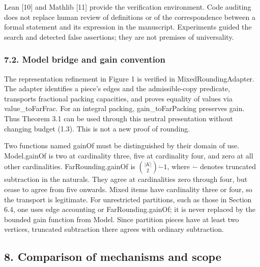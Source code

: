 \documentclass[english,11pt,a4paper]{article}
\begin{document}
Lean {[}10{]} and Mathlib {[}11{]} provide the verification environment. Code auditing does not replace human review of definitions or of the correspondence between a formal statement and its expression in the manuscript. Experiments guided the search and detected false assertions; they are not premises of universality.

\subsubsection{7.2. Model bridge and gain convention}\label{model-bridge-and-gain-convention}

The representation refinement in Figure 1 is verified in {\ttfamily\small MixedRoundin\discretionary{\hbox{\ensuremath{\hookrightarrow}}}{}{}gAdapter}. The adapter identifies a piece's edges and the admissible-copy predicate, transports fractional packing capacities, and proves equality of values via {\ttfamily\small value\_\discretionary{\hbox{\ensuremath{\hookrightarrow}}}{}{}toFarFrac}. For an integral packing, {\ttfamily\small gain\_\discretionary{\hbox{\ensuremath{\hookrightarrow}}}{}{}toFarPacking} preserves gain. Thus Theorem 3.1 can be used through this neutral presentation without changing budget (1.3). This is not a new proof of rounding.

Two functions named {\ttfamily\small gainOf} must be distinguished by their domain of use. {\ttfamily\small Model.\discretionary{\hbox{\ensuremath{\hookrightarrow}}}{}{}gainOf} is two at cardinality three, five at cardinality four, and zero at all other cardinalities. {\ttfamily\small FarRounding.\discretionary{\hbox{\ensuremath{\hookrightarrow}}}{}{}gainOf} is \(\binom{|K|}{2}\mathbin{\dot-}1\), where \(\dot-\) denotes truncated subtraction in the naturals. They agree at cardinalities zero through four, but cease to agree from five onwards. Mixed items have cardinality three or four, so the transport is legitimate. For unrestricted partitions, such as those in Section 6.4, one uses edge accounting or {\ttfamily\small FarRounding.\discretionary{\hbox{\ensuremath{\hookrightarrow}}}{}{}gainOf}; it is never replaced by the bounded gain function from {\ttfamily\small Model}. Since partition pieces have at least two vertices, truncated subtraction there agrees with ordinary subtraction.

\subsection{8. Comparison of mechanisms and scope}\label{comparison-of-mechanisms-and-scope}
\end{document}
